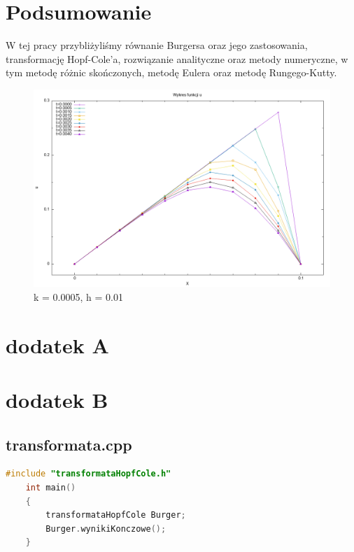 \documentclass[a4paper,12pt]{article}
\begin{document}
\section{Podsumowanie}
W tej pracy przybliżyliśmy równanie Burgersa oraz jego zastosowania, transformację Hopf-Cole'a, rozwiązanie analityczne oraz metody numeryczne, w tym metodę różnic skończonych, metodę Eulera oraz metodę Rungego-Kutty.
\begin{figure}[h!]
	\centering
	\includegraphics[width=0.7\linewidth]{rys/wykresy dla u(x,t)2.png}
	\caption{k = 0.0005, h = 0.01}
	\label{wyk2}
\end{figure}
\newpage
\section{dodatek A}




\section{dodatek B}

\subsection{transformata.cpp}
\begin{lstlisting}[caption={transformata.cpp},label={transformataCalyKod}, language=C++]
	#include "transformataHopfCole.h"
	int main()
	{
		transformataHopfCole Burger;
		Burger.wynikiKonczowe();
	}
\end{lstlisting}
\end{document}
